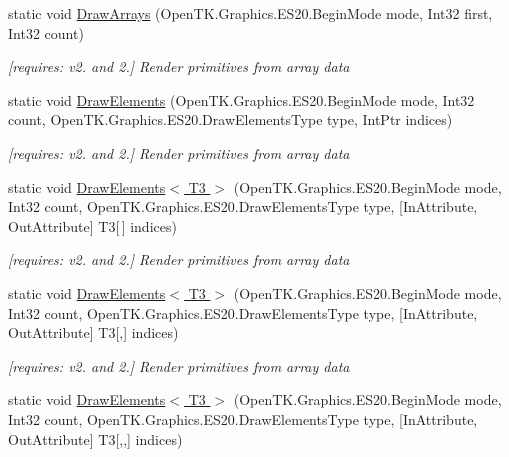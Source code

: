 \begin{DoxyCompactItemize}
static void \hyperlink{class_open_t_k_1_1_graphics_1_1_e_s20_1_1_g_l_a66410d54589443e6dc95f5fd1368009a}{Draw\-Arrays} (Open\-T\-K.\-Graphics.\-E\-S20.\-Begin\-Mode mode, Int32 first, Int32 count)
\begin{DoxyCompactList}\small\item\em \mbox{[}requires\-: v2. and 2.\mbox{]} Render primitives from array data \end{DoxyCompactList}\item 
static void \hyperlink{class_open_t_k_1_1_graphics_1_1_e_s20_1_1_g_l_ac8b383f56070b391b798336ccc0796ae}{Draw\-Elements} (Open\-T\-K.\-Graphics.\-E\-S20.\-Begin\-Mode mode, Int32 count, Open\-T\-K.\-Graphics.\-E\-S20.\-Draw\-Elements\-Type type, Int\-Ptr indices)
\begin{DoxyCompactList}\small\item\em \mbox{[}requires\-: v2. and 2.\mbox{]} Render primitives from array data \end{DoxyCompactList}\item 
static void \hyperlink{class_open_t_k_1_1_graphics_1_1_e_s20_1_1_g_l_a50709887ac15a3c41091860acac25a5a}{Draw\-Elements$<$ T3 $>$} (Open\-T\-K.\-Graphics.\-E\-S20.\-Begin\-Mode mode, Int32 count, Open\-T\-K.\-Graphics.\-E\-S20.\-Draw\-Elements\-Type type, \mbox{[}In\-Attribute, Out\-Attribute\mbox{]} T3\mbox{[}$\,$\mbox{]} indices)
\begin{DoxyCompactList}\small\item\em \mbox{[}requires\-: v2. and 2.\mbox{]} Render primitives from array data \end{DoxyCompactList}\item 
static void \hyperlink{class_open_t_k_1_1_graphics_1_1_e_s20_1_1_g_l_a45d97baf4b318582c07c80c1f0924a64}{Draw\-Elements$<$ T3 $>$} (Open\-T\-K.\-Graphics.\-E\-S20.\-Begin\-Mode mode, Int32 count, Open\-T\-K.\-Graphics.\-E\-S20.\-Draw\-Elements\-Type type, \mbox{[}In\-Attribute, Out\-Attribute\mbox{]} T3\mbox{[},\mbox{]} indices)
\begin{DoxyCompactList}\small\item\em \mbox{[}requires\-: v2. and 2.\mbox{]} Render primitives from array data \end{DoxyCompactList}\item 
static void \hyperlink{class_open_t_k_1_1_graphics_1_1_e_s20_1_1_g_l_a00a188326d640aac268903b4e07c30f3}{Draw\-Elements$<$ T3 $>$} (Open\-T\-K.\-Graphics.\-E\-S20.\-Begin\-Mode mode, Int32 count, Open\-T\-K.\-Graphics.\-E\-S20.\-Draw\-Elements\-Type type, \mbox{[}In\-Attribute, Out\-Attribute\mbox{]} T3\mbox{[},,\mbox{]} indices)

\end{DoxyCompactItemize}
